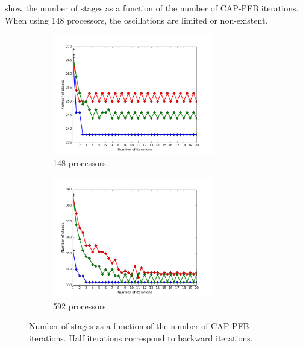 \documentclass[letterpaper]{article}
\renewcommand{\(}{\left(}
\renewcommand{\)}{\right)}
\renewcommand{\[}{\left[}
\renewcommand{\]}{\right]}
\begin{document}
 show the number of stages
as a function of the number of CAP-PFB iterations. When using 148 processors,
the oscillations are limited or non-existent.
\begin{figure}[H]
  \begin{subfigure}[b]{.5\textwidth}
    \centering
    \includegraphics[width=7cm]{convergence_central_148}
    \caption{148 processors.}
  \label{convergence_central_148}
  \end{subfigure}
  \begin{subfigure}[b]{.5\textwidth}
    \centering
    \includegraphics[width=7cm]{convergence_central_592}
    \caption{592 processors.}
  \label{convergence_central_592}
  \end{subfigure}
  \caption{Number of stages as a function of the number of CAP-PFB iterations.
  Half iterations correspond to backward iterations.}
\end{figure}
\end{document}
